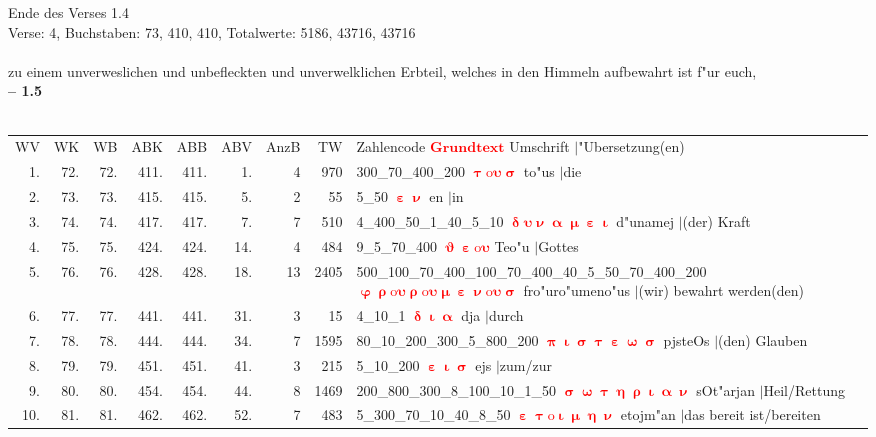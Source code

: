 \documentclass[a4paper,10pt,landscape]{article}
\begin{document}
Ende des Verses 1.4\\
Verse: 4, Buchstaben: 73, 410, 410, Totalwerte: 5186, 43716, 43716\\
\\
zu einem unverweslichen und unbefleckten und unverwelklichen Erbteil, welches in den Himmeln aufbewahrt ist f"ur euch,\\
\newpage 
{\bf -- 1.5}\\
\medskip \\
\begin{tabular}{rrrrrrrrp{120mm}}
WV&WK&WB&ABK&ABB&ABV&AnzB&TW&Zahlencode \textcolor{red}{$\boldsymbol{Grundtext}$} Umschrift $|$"Ubersetzung(en)\\
1.&72.&72.&411.&411.&1.&4&970&300\_70\_400\_200 \textcolor{red}{$\boldsymbol{\uptau\mathrm{o}\upsilon\upsigma}$} to"us $|$die\\
2.&73.&73.&415.&415.&5.&2&55&5\_50 \textcolor{red}{$\boldsymbol{\upepsilon\upnu}$} en $|$in\\
3.&74.&74.&417.&417.&7.&7&510&4\_400\_50\_1\_40\_5\_10 \textcolor{red}{$\boldsymbol{\updelta\upsilon\upnu\upalpha\upmu\upepsilon\upiota}$} d"unamej $|$(der) Kraft\\
4.&75.&75.&424.&424.&14.&4&484&9\_5\_70\_400 \textcolor{red}{$\boldsymbol{\upvartheta\upepsilon\mathrm{o}\upsilon}$} Teo"u $|$Gottes\\
5.&76.&76.&428.&428.&18.&13&2405&500\_100\_70\_400\_100\_70\_400\_40\_5\_50\_70\_400\_200 \textcolor{red}{$\boldsymbol{\upvarphi\uprho\mathrm{o}\upsilon\uprho\mathrm{o}\upsilon\upmu\upepsilon\upnu\mathrm{o}\upsilon\upsigma}$} fro"uro"umeno"us $|$(wir) bewahrt werden(den)\\
6.&77.&77.&441.&441.&31.&3&15&4\_10\_1 \textcolor{red}{$\boldsymbol{\updelta\upiota\upalpha}$} dja $|$durch\\
7.&78.&78.&444.&444.&34.&7&1595&80\_10\_200\_300\_5\_800\_200 \textcolor{red}{$\boldsymbol{\uppi\upiota\upsigma\uptau\upepsilon\upomega\upsigma}$} pjsteOs $|$(den) Glauben\\
8.&79.&79.&451.&451.&41.&3&215&5\_10\_200 \textcolor{red}{$\boldsymbol{\upepsilon\upiota\upsigma}$} ejs $|$zum/zur\\
9.&80.&80.&454.&454.&44.&8&1469&200\_800\_300\_8\_100\_10\_1\_50 \textcolor{red}{$\boldsymbol{\upsigma\upomega\uptau\upeta\uprho\upiota\upalpha\upnu}$} sOt"arjan $|$Heil/Rettung\\
10.&81.&81.&462.&462.&52.&7&483&5\_300\_70\_10\_40\_8\_50 \textcolor{red}{$\boldsymbol{\upepsilon\uptau\mathrm{o}\upiota\upmu\upeta\upnu}$} etojm"an $|$das bereit ist/bereiten\\

\end{tabular}
\end{document}
